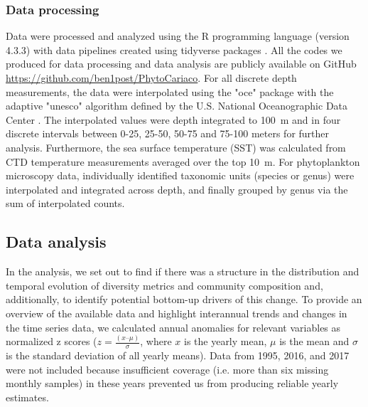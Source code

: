 \documentclass[draft]{agujournal2019}
\begin{document}
    \subsubsection{Data processing}
    Data were processed and analyzed using the R programming language (version 4.3.3) \cite{r_core_team_r_2024} with data pipelines created using tidyverse packages \cite{wickham_welcome_2019}. All the codes we produced for data processing and data analysis are publicly available on GitHub \url{https://github.com/ben1post/PhytoCariaco}.
    For all discrete depth measurements, the data were interpolated using the "oce" package \cite{kelley_oce_2023} with the adaptive "unesco" algorithm defined by the U.S. National Oceanographic Data Center \cite{johnson2006world}. The interpolated values were depth integrated to \qty{100}{\meter} and in four discrete intervals between 0-25, 25-50, 50-75 and 75-100 meters for further analysis. Furthermore, the sea surface temperature (SST) was calculated from CTD temperature measurements averaged over the top \qty{10}{\meter}. For phytoplankton microscopy data, individually identified taxonomic units (species or genus) were interpolated and integrated across depth, and finally grouped by genus via the sum of interpolated counts.


\subsection{Data analysis}    
    In the analysis, we set out to find if there was a structure in the distribution and temporal evolution of diversity metrics and community composition and, additionally, to identify potential bottom-up drivers of this change. 
    To provide an overview of the available data and highlight interannual trends and changes in the time series data, we calculated annual anomalies for relevant variables as normalized z scores ($z = \frac{(x – \mu)}{\sigma}$, where $x$ is the yearly mean, $\mu$ is the mean and $\sigma$ is the standard deviation of all yearly means). Data from 1995, 2016, and 2017 were not included because insufficient coverage (i.e. more than six missing monthly samples) in these years prevented us from producing reliable yearly estimates. 
    
\end{document}
